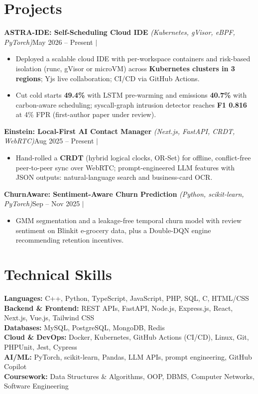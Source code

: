 \documentclass[a4paper,11pt]{article}
\newcommand{\project}[3]{\textbf{#1} \textit{\small(#2)}\hfill{\small #3}\par}
\newcommand{\gap}{\vspace{4pt}}
\begin{document}
\section{Projects}
\project{ASTRA-IDE: Self-Scheduling Cloud IDE}{Kubernetes, gVisor, eBPF, PyTorch}
  {May 2026 -- Present $\vert$ \href{https://astraide.tech}{\faGlobe} \href{https://github.com/PrasannaMishra001/astra-ide}{\faGithub}}
\begin{itemize}
  \item Deployed a scalable cloud IDE with per-workspace containers and risk-based isolation (runc, gVisor or microVM) across \textbf{Kubernetes clusters in 3 regions}; Yjs live collaboration; CI/CD via GitHub Actions.
  \item Cut cold starts \textbf{49.4\%} with LSTM pre-warming and emissions \textbf{40.7\%} with carbon-aware scheduling; syscall-graph intrusion detector reaches \textbf{F1 0.816} at 4\% FPR (first-author paper under review).
\end{itemize}
\gap
\project{Einstein: Local-First AI Contact Manager}{Next.js, FastAPI, CRDT, WebRTC}
  {Aug 2025 -- Present $\vert$ \href{https://iiitmgwalior.vercel.app/}{\faGlobe} \href{https://github.com/PrasannaMishra001/einstein-contact-manager}{\faGithub}}
\begin{itemize}
  \item Hand-rolled a \textbf{CRDT} (hybrid logical clocks, OR-Set) for offline, conflict-free peer-to-peer sync over WebRTC; prompt-engineered LLM features with JSON outputs: natural-language search and business-card OCR.
\end{itemize}
\gap
\project{ChurnAware: Sentiment-Aware Churn Prediction}{Python, scikit-learn, PyTorch}
  {Sep -- Nov 2025 $\vert$ \href{https://churn-aware.vercel.app}{\faGlobe} \href{https://github.com/PrasannaMishra001/ChurnAware}{\faGithub}}
\begin{itemize}
  \item GMM segmentation and a leakage-free temporal churn model with review sentiment on Blinkit e-grocery data, plus a Double-DQN engine recommending retention incentives.
\end{itemize}

\section{Technical Skills}
{\small
\textbf{Languages:} C++, Python, TypeScript, JavaScript, PHP, SQL, C, HTML/CSS\\
\textbf{Backend \& Frontend:} REST APIs, FastAPI, Node.js, Express.js, React, Next.js, Vue.js, Tailwind CSS\\
\textbf{Databases:} MySQL, PostgreSQL, MongoDB, Redis\\
\textbf{Cloud \& DevOps:} Docker, Kubernetes, GitHub Actions (CI/CD), Linux, Git, PHPUnit, Jest, Cypress\\
\textbf{AI/ML:} PyTorch, scikit-learn, Pandas, LLM APIs, prompt engineering, GitHub Copilot\\
\textbf{Coursework:} Data Structures \& Algorithms, OOP, DBMS, Computer Networks, Software Engineering\par}
\end{document}
